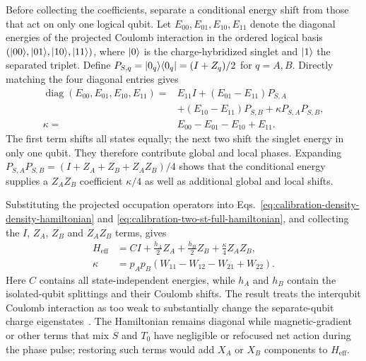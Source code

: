 Before collecting the coefficients, separate a conditional energy
shift from those that act on only one logical qubit. Let
$E_{00},E_{01},E_{10},E_{11}$ denote the diagonal energies of the
projected Coulomb interaction in the ordered logical basis
$(\lvert 00\rangle,\lvert 01\rangle,\lvert 10\rangle,\lvert 11\rangle)$, where $\lvert 0\rangle$ is the
charge-hybridized singlet and $\lvert 1\rangle$ the separated triplet.
Define $P_{S,q}=\lvert 0_q\rangle\langle 0_q\rvert=(I+Z_q)/2$ for $q=A,B$.
Directly matching the four diagonal entries gives
\begin{equation}
 \begin{aligned}
 \operatorname{diag}(E_{00},E_{01},E_{10},E_{11})
   ={}&E_{11}I+(E_{01}-E_{11})P_{S,A}\\
     &+(E_{10}-E_{11})P_{S,B}
       +\kappa P_{S,A}P_{S,B},\\
 \kappa={}&E_{00}-E_{01}-E_{10}+E_{11}.
 \end{aligned}
 \label{eq:st-interaction-decomposition}
\end{equation}
The first term shifts all states equally; the next two shift the
singlet energy in only one qubit. They therefore contribute global
and local phases. Expanding
$P_{S,A}P_{S,B}=(I+Z_A+Z_B+Z_AZ_B)/4$ shows that the conditional
energy supplies a $Z_AZ_B$ coefficient $\kappa/4$ as well as
additional global and local shifts.

Substituting the projected occupation operators into
Eqs.~\eqref{eq:calibration-density-density-hamiltonian} and
\eqref{eq:calibration-two-st-full-hamiltonian}, and collecting the
$I$, $Z_A$, $Z_B$ and $Z_AZ_B$ terms, gives
\begin{equation}
 \begin{aligned}
 H_{\mathrm{eff}}
 &=C I+\frac{h_A}{2}Z_A+\frac{h_B}{2}Z_B
   +\frac{\kappa}{4}Z_AZ_B,\\
 \kappa
 &=p_Ap_B(W_{11}-W_{12}-W_{21}+W_{22}).
 \end{aligned}
 \label{eq:calibration-st-capacitive-logical-hamiltonian}
\end{equation}
Here $C$ contains all state-independent energies, while $h_A$ and
$h_B$ contain the isolated-qubit splittings and their Coulomb
shifts. The result treats the interqubit Coulomb interaction as too
weak to substantially change the separate-qubit charge
eigenstates~\cite{Shulman2012}. The Hamiltonian remains diagonal while
magnetic-gradient or other terms that mix $S$ and $T_0$ have
negligible or refocused net action during the phase pulse; restoring
such terms would add $X_A$ or $X_B$ components to
$H_{\mathrm{eff}}$.

